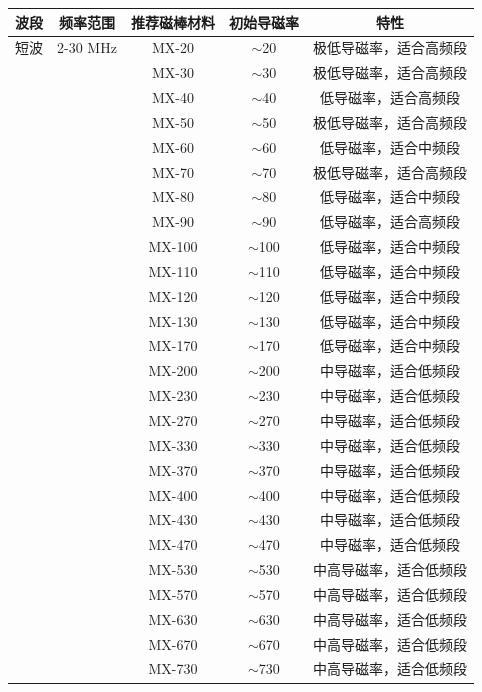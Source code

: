 \begin{center}
\begin{tabular}{|c|c|c|c|c|}
\hline
\textbf{波段} & \textbf{频率范围} & \textbf{推荐磁棒材料} & \textbf{初始导磁率} & \textbf{特性} \\
\hline
短波 & 2-30 MHz & MX-20 & $\sim$20 & 极低导磁率，适合高频段 \\
 & & MX-30 & $\sim$30 & 极低导磁率，适合高频段 \\
 & & MX-40 & $\sim$40 & 低导磁率，适合高频段 \\
 & & MX-50 & $\sim$50 & 极低导磁率，适合高频段 \\
 & & MX-60 & $\sim$60 & 低导磁率，适合中频段 \\
 & & MX-70 & $\sim$70 & 极低导磁率，适合高频段 \\
 & & MX-80 & $\sim$80 & 低导磁率，适合中频段 \\
 & & MX-90 & $\sim$90 & 低导磁率，适合高频段 \\
 & & MX-100 & $\sim$100 & 低导磁率，适合中频段 \\
 & & MX-110 & $\sim$110 & 低导磁率，适合中频段 \\
 & & MX-120 & $\sim$120 & 低导磁率，适合中频段 \\
 & & MX-130 & $\sim$130 & 低导磁率，适合中频段 \\
 & & MX-170 & $\sim$170 & 低导磁率，适合中频段 \\
 & & MX-200 & $\sim$200 & 中导磁率，适合低频段 \\
 & & MX-230 & $\sim$230 & 中导磁率，适合低频段 \\
 & & MX-270 & $\sim$270 & 中导磁率，适合低频段 \\
 & & MX-330 & $\sim$330 & 中导磁率，适合低频段 \\
 & & MX-370 & $\sim$370 & 中导磁率，适合低频段 \\
 & & MX-400 & $\sim$400 & 中导磁率，适合低频段 \\
 & & MX-430 & $\sim$430 & 中导磁率，适合低频段 \\
 & & MX-470 & $\sim$470 & 中导磁率，适合低频段 \\
 & & MX-530 & $\sim$530 & 中高导磁率，适合低频段 \\
 & & MX-570 & $\sim$570 & 中高导磁率，适合低频段 \\
 & & MX-630 & $\sim$630 & 中高导磁率，适合低频段 \\
 & & MX-670 & $\sim$670 & 中高导磁率，适合低频段 \\
 & & MX-730 & $\sim$730 & 中高导磁率，适合低频段 \\

\end{tabular}
\end{center}
